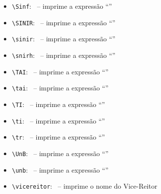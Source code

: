 \begin{itemize}
 \item \verb|\Sinf|: \Sinf\  -- imprime a expressão ``\Sinf''
 \item \verb|\SINIR|: \SINIR\ -- imprime a expressão ``\SINIR''
 \item \verb|\sinir|: \sinir\  -- imprime a expressão ``\sinir''
 \item \verb|\snirh|: \snirh\ -- imprime a expressão ``\snirh''
 \item \verb|\TAI|: \TAI\ -- imprime a expressão ``\TAI''
 \item \verb|\tai|: \tai\ -- imprime a expressão ``\tai''
 \item \verb|\TI|: \TI\ -- imprime a expressão ``\TI''
 \item \verb|\ti|: \ti\  -- imprime a expressão ``\ti''
 \item \verb|\tr|: \tr\ -- imprime a expressão ``\tr''
 \item \verb|\UnB|: \UnB\  -- imprime a expressão ``\UnB''
 \item \verb|\unb|: \unb\  -- imprime a expressão ``\unb''
 \item \verb|\vicereitor|: \vicereitor\ -- imprime o nome do Vice-Reitor
\end{itemize}